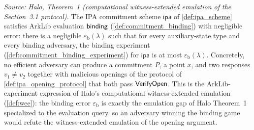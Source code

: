 \begin{theorem}
  \label{thm:ipa_binding}
  \textit{Source: Halo, Theorem~1 (computational witness-extended emulation of the
  Section~3.1 protocol).}
  The IPA commitment scheme \(\mathsf{ipa}\) of \cref{def:ipa_scheme} satisfies
  ArkLib evaluation \(\mathsf{binding}\) (\cref{def:commitment_binding}) with negligible
  error: there is a negligible \(\varepsilon_{\mathrm{b}}(\lambda)\) such that for
  every auxiliary-state type and every binding adversary, the binding experiment
  (\cref{def:commitment_binding_experiment}) for \(\mathsf{ipa}\) is at most
  \(\varepsilon_{\mathrm{b}}(\lambda)\). Concretely, no efficient adversary can
  produce a commitment \(P\), a point \(x\), and two responses \(v_{1} \neq v_{2}\)
  together with malicious openings of the protocol of
  \cref{def:ipa_opening_protocol} that both pass \(\mathsf{VerifyOpen}\). This is the
  ArkLib-experiment expression of Halo's computational witness-extended emulation
  (\cref{def:wee}): the binding error \(\varepsilon_{\mathrm{b}}\) is exactly the
  emulation gap of Halo Theorem~1 specialized to the evaluation query, so an
  adversary winning the binding game would refute the witness-extended emulation
  of the opening argument.
\end{theorem}

